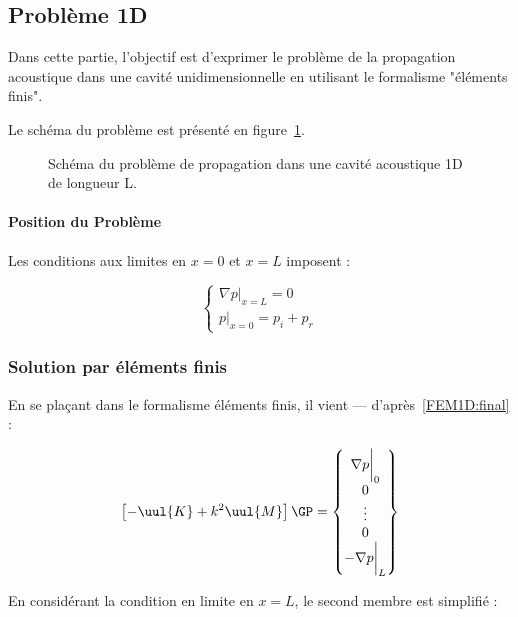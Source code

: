 \subsection{Problème 1D}

Dans cette partie, l'objectif est d'exprimer le problème de la propagation acoustique dans une cavité unidimensionnelle
en utilisant le formalisme "éléments finis".

Le schéma du problème est présenté en figure~\ref{fig:FEM:propa_1D}.

\begin{figure}[!ht]
	\centering
	
	\caption{\label{fig:FEM:propa_1D}Schéma du problème de propagation dans une cavité acoustique 1D de longueur L.}
\end{figure}

\paragraph{Position du Problème}

Les conditions aux limites en $x=0$ et $x=L$ imposent :

\begin{equation}
	\left\{\begin{array}{l}
	\left.\nabla p\right|_{x=L} = 0\\
	\left.p\right|_{x=0} = p_i+p_r
	\end{array}\right. \label{FEM1D:BC}
\end{equation}

\subsubsection{Solution par éléments finis}

En se plaçant dans le formalisme éléments finis, il vient --- d'après~\eqref{FEM1D:final} :

\begin{equation}
	\left[- \uul{K} + k^2\uul{M}\right]\GP = \begin{Bmatrix} \nabla p\bigg|_0\\0\\\vdots\\0\\-\nabla p\bigg|_L\end{Bmatrix}
\end{equation}

En considérant la condition en limite en $x=L$, le second membre est simplifié :

